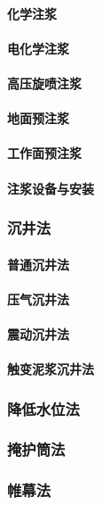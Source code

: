 \documentclass[UTF8]{../../ApplicationUniverse}
\begin{document}
            \paragraph{化学注浆}
            \paragraph{电化学注浆}
            \paragraph{高压旋喷注浆}
            \paragraph{地面预注浆}
            \paragraph{工作面预注浆}
            \paragraph{注浆设备与安装}
        \subsubsection{沉井法}
            \paragraph{普通沉井法}
            \paragraph{压气沉井法}
            \paragraph{震动沉井法}
            \paragraph{触变泥浆沉井法}
        \subsubsection{降低水位法}
        \subsubsection{掩护筒法}
        \subsubsection{帷幕法}
\end{document}
